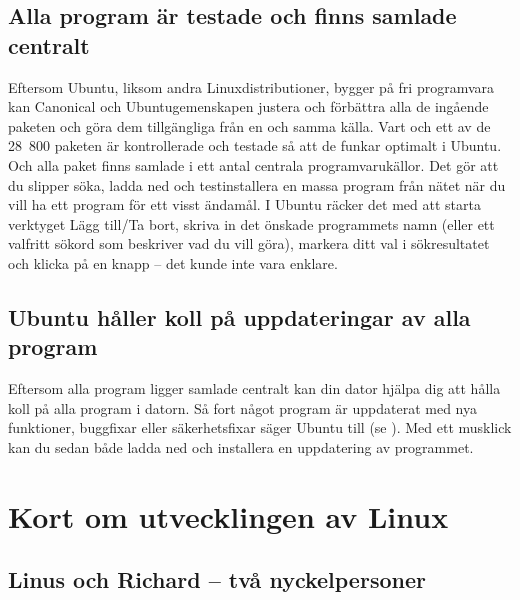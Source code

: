 \documentclass[a4paper,final]{memoir} %
\newcommand\xpackagecount{28~800} %
\begin{document}
\subsection{Alla program är testade och finns samlade centralt}

Eftersom Ubuntu, liksom andra Linuxdistributioner, bygger på fri programvara kan Canonical och Ubuntugemenskapen justera och förbättra alla de ingående paketen och göra dem tillgängliga från en och samma källa. Vart och ett av de \xpackagecount{} paketen är kontrollerade och testade så att de funkar optimalt i Ubuntu. Och alla paket finns samlade i ett antal centrala programvarukällor. Det gör att du slipper söka, ladda ned och testinstallera en massa program från nätet när du vill ha ett program för ett visst ändamål. I Ubuntu räcker det med att starta verktyget Lägg till/Ta bort, skriva in det önskade programmets namn (eller ett valfritt sökord som beskriver vad du vill göra), markera ditt val i sökresultatet och klicka på en knapp -- det kunde inte vara enklare.

\subsection{Ubuntu håller koll på uppdateringar av alla program}

Eftersom alla program ligger samlade centralt kan din dator hjälpa dig att hålla koll på alla program i datorn. Så fort något program är uppdaterat med nya funktioner, buggfixar eller säkerhetsfixar säger Ubuntu till (se ). Med ett musklick kan du sedan både ladda ned och installera en uppdatering av programmet.



\section{Kort om utvecklingen av Linux}


\subsection{Linus och Richard -- två nyckelpersoner}
\end{document}
